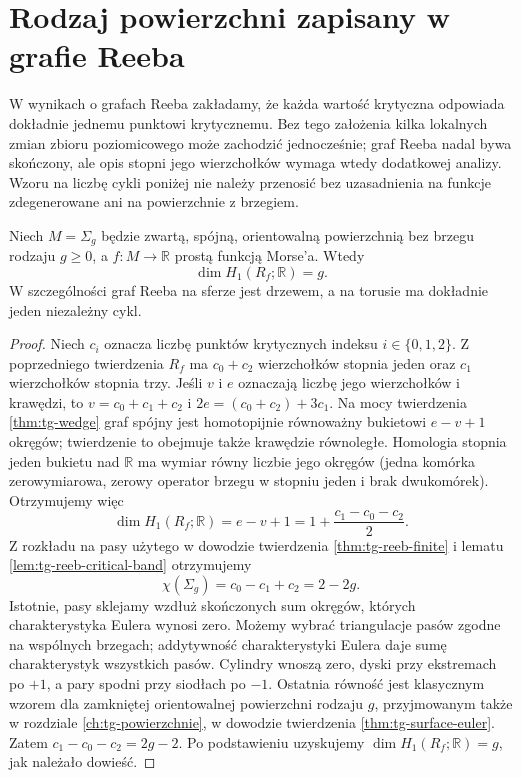 \section{Rodzaj powierzchni zapisany w grafie Reeba}
\label{sec:tg-reeb-genus}

\begin{uwaga}
W wynikach o grafach Reeba zakładamy, że każda wartość
krytyczna odpowiada dokładnie jednemu punktowi krytycznemu.
Bez tego założenia kilka lokalnych zmian zbioru poziomicowego
może zachodzić jednocześnie; graf Reeba nadal bywa skończony,
ale opis stopni jego wierzchołków wymaga wtedy dodatkowej
analizy. Wzoru na liczbę cykli poniżej nie należy przenosić
bez uzasadnienia na funkcje zdegenerowane ani na powierzchnie
z brzegiem.
\end{uwaga}

\begin{twierdzenie}
\label{thm:tg-reeb-betti}
Niech $M=\Sigma_g$ będzie zwartą, spójną, orientowalną
powierzchnią bez brzegu rodzaju $g\ge0$, a
$f:M\to\mathbb R$ prostą funkcją Morse'a. Wtedy
\[
\dim H_1(R_f;\mathbb R)=g.
\]
W szczególności graf Reeba na sferze jest drzewem,
a na torusie ma dokładnie jeden niezależny cykl.
\end{twierdzenie}

\begin{proof}
Niech $c_i$ oznacza liczbę punktów krytycznych indeksu
$i\in\{0,1,2\}$. Z poprzedniego twierdzenia $R_f$ ma
$c_0+c_2$ wierzchołków stopnia jeden oraz $c_1$
wierzchołków stopnia trzy. Jeśli $v$ i $e$ oznaczają
liczbę jego wierzchołków i krawędzi, to
$v=c_0+c_1+c_2$ i
$2e=(c_0+c_2)+3c_1$.
Na mocy twierdzenia \ref{thm:tg-wedge} graf spójny
jest homotopijnie równoważny bukietowi $e-v+1$
okręgów; twierdzenie to obejmuje także krawędzie
równoległe. Homologia stopnia jeden bukietu nad
$\mathbb R$ ma wymiar równy liczbie jego okręgów
(jedna komórka zerowymiarowa, zerowy operator
brzegu w stopniu jeden i brak dwukomórek).
Otrzymujemy więc
\[
\dim H_1(R_f;\mathbb R)=e-v+1
=1+\frac{c_1-c_0-c_2}{2}.
\]
Z rozkładu na pasy użytego w dowodzie twierdzenia
\ref{thm:tg-reeb-finite} i lematu
\ref{lem:tg-reeb-critical-band} otrzymujemy
\[
 \chi(\Sigma_g)=c_0-c_1+c_2=2-2g.
\]
Istotnie, pasy sklejamy wzdłuż skończonych sum okręgów,
których charakterystyka Eulera wynosi zero. Możemy
wybrać triangulacje pasów zgodne na wspólnych brzegach;
addytywność charakterystyki Eulera daje sumę
charakterystyk wszystkich pasów. Cylindry wnoszą zero,
dyski przy ekstremach po $+1$, a pary spodni przy
siodłach po $-1$. Ostatnia równość jest klasycznym
wzorem dla zamkniętej orientowalnej powierzchni rodzaju $g$,
przyjmowanym także w rozdziale \ref{ch:tg-powierzchnie},
w dowodzie twierdzenia \ref{thm:tg-surface-euler}.
Zatem $c_1-c_0-c_2=2g-2$. Po podstawieniu uzyskujemy
$\dim H_1(R_f;\mathbb R)=g$, jak należało dowieść.
\end{proof}


